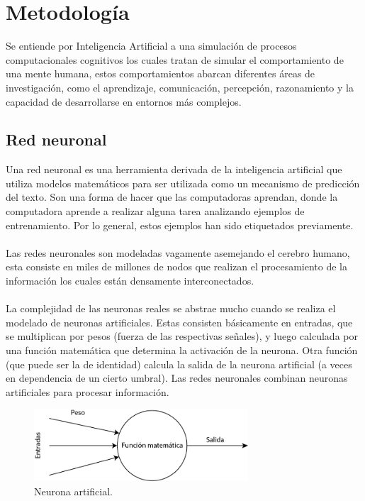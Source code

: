 \section{Metodología}
Se entiende por Inteligencia Artificial a una simulación de procesos computacionales cognitivos los cuales tratan de simular el comportamiento de una mente humana, estos comportamientos abarcan diferentes áreas de investigación, como el aprendizaje, comunicación, percepción, razonamiento y la capacidad de desarrollarse en entornos más complejos.

\subsection{Red neuronal}
Una red neuronal es una herramienta derivada de la inteligencia artificial que utiliza modelos matemáticos para ser utilizada como un mecanismo de predicción del texto. Son una forma de hacer que las computadoras aprendan, donde la computadora aprende a realizar alguna tarea analizando ejemplos de entrenamiento. Por lo general, estos ejemplos han sido etiquetados previamente.\\\\
Las redes neuronales son modeladas vagamente asemejando el cerebro humano, esta consiste en miles de millones de nodos que realizan el procesamiento de la información los cuales están densamente interconectados.\\\\
La complejidad de las neuronas reales se abstrae mucho cuando se realiza el modelado de neuronas artificiales. Estas consisten básicamente en entradas, que se multiplican por pesos (fuerza de las respectivas señales), y luego calculada por una función matemática que determina la activación de la neurona. Otra función (que puede ser la de identidad) calcula la salida de la neurona artificial (a veces en dependencia de un cierto umbral). Las redes neuronales combinan neuronas artificiales para procesar información.\cite{neuronart}

\begin{figure}[h]
	\centering
	\includegraphics[width=8cm]{figuras/NeuronaArt.png}
	\caption{Neurona artificial.}
	\label{fig:Neurona artificial}
\end{figure}


